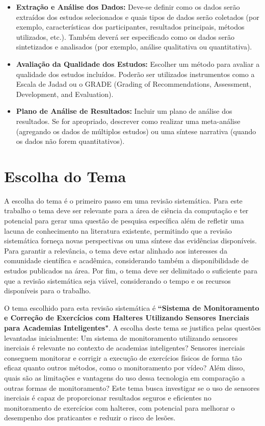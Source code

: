 \documentclass[a4paper,12pt]{article}
\begin{document}
\begin{itemize}
    \item \textbf{Extração e Análise dos Dados:} Deve-se definir como os dados serão extraídos dos estudos selecionados e quais tipos de dados serão coletados (por exemplo, características dos participantes, resultados principais, métodos utilizados, etc.). Também deverá ser especificado como os dados serão sintetizados e analisados (por exemplo, análise qualitativa ou quantitativa).
    
    \item \textbf{Avaliação da Qualidade dos Estudos:} Escolher um método para avaliar a qualidade dos estudos incluídos. Poderão ser utilizados instrumentos como a Escala de Jadad ou o GRADE (Grading of Recommendations, Assessment, Development, and Evaluation).
    
    \item \textbf{Plano de Análise de Resultados:} Incluir um plano de análise dos resultados. Se for apropriado, descrever como realizar uma meta-análise (agregando os dados de múltiplos estudos) ou uma síntese narrativa (quando os dados não forem quantitativos).
\end{itemize}

\section{Escolha do Tema}

A escolha do tema é o primeiro passo em uma revisão sistemática. Para este trabalho o tema deve ser relevante para a área de ciência da computação e ter potencial para gerar uma questão de pesquisa específica além de refletir uma lacuna de conhecimento na literatura existente, permitindo que a revisão sistemática forneça novas perspectivas ou uma síntese das evidências disponíveis. Para garantir a relevância, o tema deve estar alinhado aos interesses da comunidade científica e acadêmica, considerando também a disponibilidade de estudos publicados na área. Por fim, o tema deve ser delimitado o suficiente para que a revisão sistemática seja viável, considerando o tempo e os recursos disponíveis para o trabalho.

O tema escolhido para esta revisão sistemática é \textbf{``Sistema de Monitoramento e Correção de Exercícios com Halteres Utilizando Sensores Inerciais para Academias Inteligentes"}. A escolha deste tema se justifica pelas questões levantadas inicialmente: Um sistema de monitoramento utilizando sensores inerciais é relevante no contexto de academias inteligentes? Sensores inerciais conseguem monitorar e corrigir a execução de exercícios físicos de forma tão eficaz quanto outros métodos, como o monitoramento por vídeo? Além disso, quais são as limitações e vantagens do uso dessa tecnologia em comparação a outras formas de monitoramento? Este tema busca investigar se o uso de sensores inerciais é capaz de proporcionar resultados seguros e eficientes no monitoramento de exercícios com halteres, com potencial para melhorar o desempenho dos praticantes e reduzir o risco de lesões.
\end{document}
